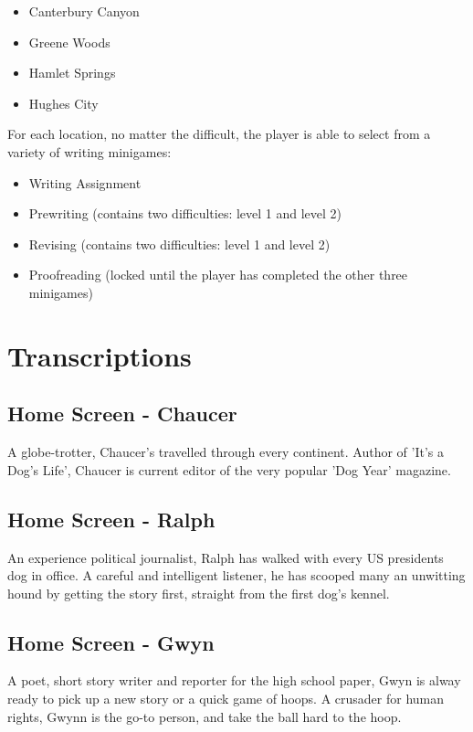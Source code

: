 \begin{itemize}
    \item Canterbury Canyon
    \item Greene Woods
    \item Hamlet Springs
    \item Hughes City
\end{itemize}

For each location, no matter the difficult, the player is able to select from a variety of writing minigames:

\begin{itemize}
    \item Writing Assignment
    \item Prewriting (contains two difficulties: level 1 and level 2)
    \item Revising (contains two difficulties: level 1 and level 2)
    \item Proofreading (locked until the player has completed the other three minigames)
\end{itemize}

\section{Transcriptions}

\subsection{Home Screen - Chaucer}

A globe-trotter, Chaucer's travelled through every continent.
Author of 'It's a Dog's Life', Chaucer is current editor of the very popular 'Dog Year' magazine.

\subsection{Home Screen - Ralph}

An experience political journalist, Ralph has walked with every US presidents dog in office.
A careful and intelligent listener, he has scooped many an unwitting hound by getting the story first, straight from the first dog's kennel.

\subsection{Home Screen - Gwyn}

A poet, short story writer and reporter for the high school paper, Gwyn is alway ready to pick up a new story or a quick game of hoops.
A crusader for human rights, Gwynn is the go-to person, and take the ball hard to the hoop.

